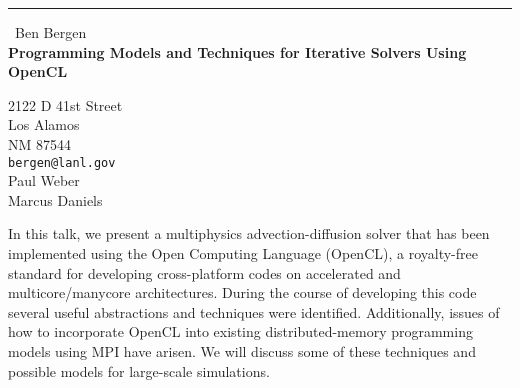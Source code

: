 \documentclass{report}
\begin{document}
\begin{center}
\rule{6in}{1pt} \
{\large Ben Bergen \\
{\bf Programming Models and Techniques for Iterative Solvers Using OpenCL}}

2122 D 41st Street \\ Los Alamos \\ NM 87544
\\
{\tt bergen@lanl.gov}\\
Paul Weber\\
Marcus Daniels\end{center}

In this talk, we present a multiphysics advection-diffusion solver that
has been implemented using the Open Computing Language (OpenCL), a
royalty-free standard for developing cross-platform codes on accelerated
and multicore/manycore architectures. During the course of developing
this code several useful abstractions and techniques were identified.
Additionally, issues of how to incorporate OpenCL into existing
distributed-memory programming models using MPI have arisen. We will
discuss some of these techniques and possible models for large-scale
simulations.
\end{document}
